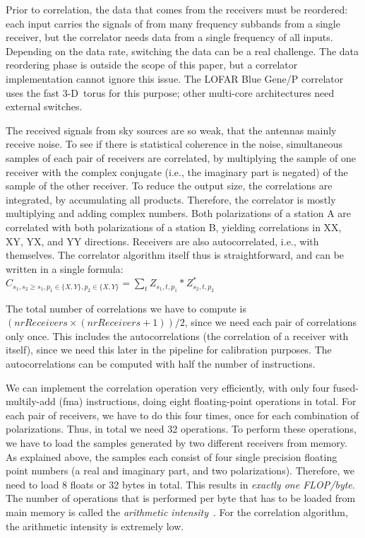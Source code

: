 \documentclass{article}
\begin{document}
Prior to correlation, the data that comes from
the receivers must be reordered:
each input carries the signals of from many frequency subbands from a single
receiver, but the correlator needs data from a single frequency of all inputs.
Depending on the data rate, switching the data can be a real challenge.
The data reordering phase is outside the scope of this paper, but a correlator
implementation cannot ignore this issue.
The LOFAR Blue Gene/P correlator uses the fast 3-D~torus for this purpose;
other multi-core architectures need external switches.

The received signals from sky sources are so weak, that the antennas 
mainly receive noise. To see if there is statistical coherence
in the noise, simultaneous samples of each pair of receivers are correlated, 
by multiplying the sample of one receiver with the complex
conjugate (i.e., the imaginary part is negated) of the sample of the other receiver.
To reduce the output size, the correlations are integrated, by accumulating all products. 
Therefore, the correlator is mostly multiplying and adding complex numbers.
Both polarizations of a station A are correlated with both polarizations 
of a station B, yielding correlations in XX, XY, YX, and YY
directions. Receivers are also autocorrelated, i.e., with
themselves. 
The correlator algorithm itself thus is straightforward, and can be
written in a single formula: \\
$C_{s_1,s_2\geq s_1,p_1\in\{X,Y\},p_2\in\{X,Y\}} = \displaystyle\sum_{t} Z_{s_1,t,p_1} * Z_{s_2,t,p_2}^\ast$ 

The total number of correlations we have to compute is $(nrReceivers \times
(nrReceivers + 1)) / 2$, since we need each pair of correlations only
once. This includes the autocorrelations (the correlation of a receiver with itself),
since we need this later in the pipeline for calibration purposes.
The autocorrelations can be computed with half the number of instructions.

We can implement the correlation operation very efficiently, with only
four fused-multily-add (fma) instructions, doing eight floating-point
operations in total. For each pair of receivers, we have to do this
four times, once for each combination of polarizations. Thus, in total
we need 32 operations. To perform these operations, we have to load
the samples generated by two different receivers from memory.  As
explained above, the samples each consist of four single precision
floating point numbers (a real and imaginary part, and two
polarizations).  Therefore, we need to load 8 floats or 32 bytes in
total.  This results in \emph{exactly one FLOP/byte}.  The number of
operations that is performed per byte that has to be loaded from main
memory is called the \emph{arithmetic
  intensity}~\cite{system-performance}.  For the correlation
algorithm, the arithmetic intensity is extremely low.
\end{document}
